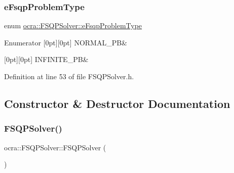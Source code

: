 \subsubsection{\texorpdfstring{e\+Fsqp\+Problem\+Type}{eFsqpProblemType}}
{\footnotesize\ttfamily enum \hyperlink{classocra_1_1FSQPSolver_a1a9c37974603d734acab0d75bc9462ac}{ocra\+::\+F\+S\+Q\+P\+Solver\+::e\+Fsqp\+Problem\+Type}}

\begin{DoxyEnumFields}{Enumerator}
[0pt][0pt]{}\hypertarget{classocra_1_1FSQPSolver_a1a9c37974603d734acab0d75bc9462acacd159960544cc4516017ccc5a9cb7f03}{}\label{classocra_1_1FSQPSolver_a1a9c37974603d734acab0d75bc9462acacd159960544cc4516017ccc5a9cb7f03} 
N\+O\+R\+M\+A\+L\+\_\+\+PB&\\
\hline

[0pt][0pt]{}\hypertarget{classocra_1_1FSQPSolver_a1a9c37974603d734acab0d75bc9462aca5cf174ae93fdf71512308b3a2d501b87}{}\label{classocra_1_1FSQPSolver_a1a9c37974603d734acab0d75bc9462aca5cf174ae93fdf71512308b3a2d501b87} 
I\+N\+F\+I\+N\+I\+T\+E\+\_\+\+PB&\\
\hline

\end{DoxyEnumFields}


Definition at line 53 of file F\+S\+Q\+P\+Solver.\+h.



\subsection{Constructor \& Destructor Documentation}
\hypertarget{classocra_1_1FSQPSolver_a8eeae2b05133e4f5e134fc1ee11ccb49}{}\label{classocra_1_1FSQPSolver_a8eeae2b05133e4f5e134fc1ee11ccb49} 
\subsubsection{\texorpdfstring{F\+S\+Q\+P\+Solver()}{FSQPSolver()}}
{\footnotesize\ttfamily ocra\+::\+F\+S\+Q\+P\+Solver\+::\+F\+S\+Q\+P\+Solver (\begin{DoxyParamCaption}{ }\end{DoxyParamCaption})}



